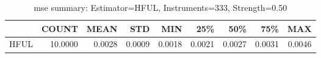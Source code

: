 \begin{table}[ht]
\centering
\caption{mse summary: Estimator=HFUL, Instruments=333, Strength=0.50}
\begin{tabular}{lrrrrrrrr}
\toprule
 & COUNT & MEAN & STD & MIN & 25\% & 50\% & 75\% & MAX \\
\midrule
HFUL & 10.0000 & 0.0028 & 0.0009 & 0.0018 & 0.0021 & 0.0027 & 0.0031 & 0.0046 \\
\bottomrule
\end{tabular}
\end{table}
